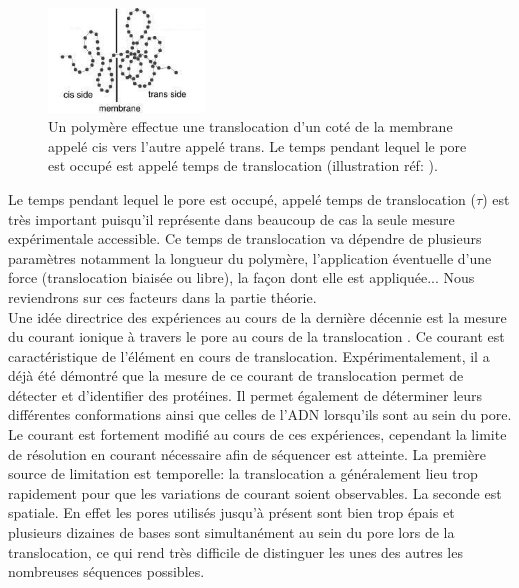 \documentclass[a4paper,11pt]{article}
\begin{document}
\begin{figure}[H]
\begin{center}
\includegraphics[width=0.37\textwidth]{transloc.jpg}

\caption{Un polymère effectue une translocation d'un coté de la membrane appelé cis vers l'autre appelé trans. Le temps pendant lequel le pore est occupé est appelé temps de translocation (illustration réf: \cite{sung}).}
\label{transloc}
\end{center}
\end{figure}



Le temps pendant lequel le pore est occupé, appelé temps de translocation ($\tau$) est très important puisqu'il représente dans beaucoup de cas la seule mesure expérimentale accessible. Ce temps de translocation va dépendre de plusieurs paramètres notamment la longueur du polymère, l'application éventuelle d'une force (translocation biaisée ou libre), la façon dont elle est appliquée... Nous reviendrons sur ces facteurs dans la partie théorie.\\

 Une idée directrice des expériences au cours de la dernière décennie est la mesure du courant ionique à travers le pore au cours de la translocation \cite{holesedge}. Ce courant est caractéristique de l'élément en cours de translocation. Expérimentalement, il a déjà été démontré que la mesure de ce courant de translocation permet de détecter et d'identifier des protéines. Il permet également de déterminer leurs différentes conformations ainsi que celles de l'ADN lorsqu'ils sont au sein du pore.\\
 
Le courant est fortement modifié au cours de ces expériences, cependant la limite de résolution en courant nécessaire afin de séquencer est atteinte. La première source de limitation est temporelle: la translocation a généralement lieu trop rapidement pour que les variations de courant soient observables. La seconde est spatiale. En effet les pores utilisés jusqu'à présent sont bien trop épais et plusieurs dizaines de bases sont simultanément au sein du pore lors de la translocation, ce qui rend très difficile de distinguer les unes des autres les nombreuses séquences possibles.
 
\end{document}

